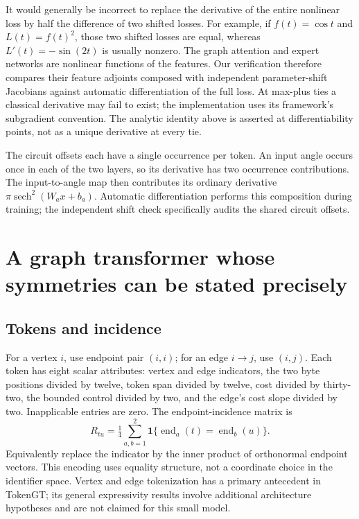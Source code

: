 It would generally be incorrect to replace the derivative of the entire
nonlinear loss by half the difference of two shifted losses. For example,
if $f(t)=\cos t$ and $L(t)=f(t)^2$, those two shifted losses are equal,
whereas $L'(t)=-\sin(2t)$ is usually nonzero. The graph attention and
expert networks are nonlinear functions of the features. Our verification
therefore compares their feature adjoints composed with independent
parameter-shift Jacobians against automatic differentiation of the full
loss. At max-plus ties a classical derivative may fail to exist; the
implementation uses its framework's subgradient convention. The analytic
identity above is asserted at differentiability points, not as a unique
derivative at every tie.

The circuit offsets each have a single occurrence per token. An input
angle occurs once in each of the two layers, so its derivative has two
occurrence contributions. The input-to-angle map then contributes its
ordinary derivative $\pi\operatorname{sech}^2(W_ax+b_a)$. Automatic
differentiation performs this composition during training; the independent
shift check specifically audits the shared circuit offsets.

\section{A graph transformer whose symmetries can be stated precisely}

\subsection{Tokens and incidence}

For a vertex $i$, use endpoint pair $(i,i)$; for an edge $i\to j$, use
$(i,j)$. Each token has eight scalar attributes: vertex and edge indicators,
the two byte positions divided by twelve, token span divided by twelve,
cost divided by thirty-two, the bounded control divided by two, and the
edge's cost slope divided by two. Inapplicable entries are zero.
The endpoint-incidence matrix is
\[
 R_{tu}=\tfrac14\sum_{a,b=1}^2
   \mathbf1\{\operatorname{end}_a(t)=\operatorname{end}_b(u)\}.
\]
Equivalently replace the indicator by the inner product of orthonormal
endpoint vectors. This encoding uses equality structure, not a coordinate
choice in the identifier space. Vertex and edge tokenization has a primary
antecedent in TokenGT; its general expressivity results involve additional
architecture hypotheses and are not claimed for this small model.
\cite{qtTokenGT}

